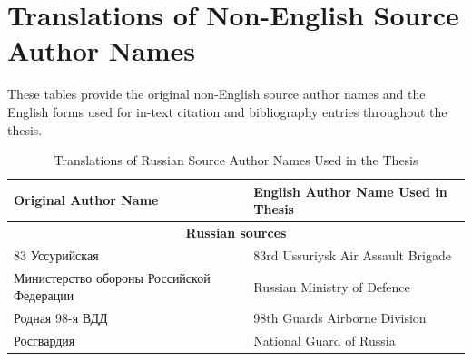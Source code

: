  
 

\pagebreak
\section*{Translations of Non-English Source Author Names}

These tables provide the original non-English source author names and the English forms used for in-text citation and bibliography entries throughout the thesis.
\linebreak

\begin{table}[H]
	\centering
	\small
	\begin{tabular}{p{} p{}}
		\toprule
		Original Author Name & English Author Name Used in Thesis \\
		\midrule
		\multicolumn{2}{c}{\textbf{Russian sources}} \\
		\midrule
		83 Уссурийская & 83rd Ussuriysk Air Assault Brigade \\
		Министерство обороны Российской Федерации & Russian Ministry of Defence \\
		Родная 98-я ВДД & 98th Guards Airborne Division \\
		Росгвардия & National Guard of Russia \\
		\bottomrule
	\end{tabular}
	\caption[Translations of Russian Source Author Names]{Translations of Russian Source Author Names Used in the Thesis}
	\label{tab:russian-source-name-translations}
\end{table}

